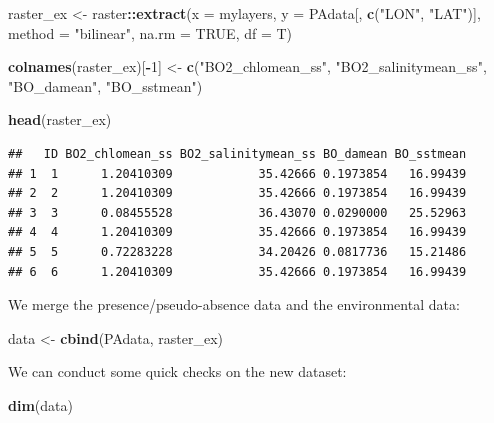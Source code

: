 \documentclass[
]{book}
\newenvironment{Shaded}{\begin{snugshade}}{\end{snugshade}}
\newcommand{\AttributeTok}[1]{\textcolor[rgb]{0.13,0.29,0.53}{#1}}
\newcommand{\ConstantTok}[1]{\textcolor[rgb]{0.56,0.35,0.01}{#1}}
\newcommand{\DecValTok}[1]{\textcolor[rgb]{0.00,0.00,0.81}{#1}}
\newcommand{\FunctionTok}[1]{\textcolor[rgb]{0.13,0.29,0.53}{\textbf{#1}}}
\newcommand{\NormalTok}[1]{#1}
\newcommand{\OtherTok}[1]{\textcolor[rgb]{0.56,0.35,0.01}{#1}}
\newcommand{\SpecialCharTok}[1]{\textcolor[rgb]{0.81,0.36,0.00}{\textbf{#1}}}
\newcommand{\StringTok}[1]{\textcolor[rgb]{0.31,0.60,0.02}{#1}}
\begin{document}
\begin{Shaded}
\begin{Highlighting}[]
\NormalTok{raster\_ex }\OtherTok{\textless{}{-}}\NormalTok{ raster}\SpecialCharTok{::}\FunctionTok{extract}\NormalTok{(}\AttributeTok{x =}\NormalTok{ mylayers,}
    \AttributeTok{y =}\NormalTok{ PAdata[, }\FunctionTok{c}\NormalTok{(}\StringTok{"LON"}\NormalTok{, }\StringTok{"LAT"}\NormalTok{)], }\AttributeTok{method =} \StringTok{"bilinear"}\NormalTok{,}
    \AttributeTok{na.rm =} \ConstantTok{TRUE}\NormalTok{, }\AttributeTok{df =}\NormalTok{ T)}

\FunctionTok{colnames}\NormalTok{(raster\_ex)[}\SpecialCharTok{{-}}\DecValTok{1}\NormalTok{] }\OtherTok{\textless{}{-}} \FunctionTok{c}\NormalTok{(}\StringTok{"BO2\_chlomean\_ss"}\NormalTok{,}
    \StringTok{"BO2\_salinitymean\_ss"}\NormalTok{, }\StringTok{"BO\_damean"}\NormalTok{, }\StringTok{"BO\_sstmean"}\NormalTok{)}

\FunctionTok{head}\NormalTok{(raster\_ex)}
\end{Highlighting}
\end{Shaded}

\begin{verbatim}
##   ID BO2_chlomean_ss BO2_salinitymean_ss BO_damean BO_sstmean
## 1  1      1.20410309            35.42666 0.1973854   16.99439
## 2  2      1.20410309            35.42666 0.1973854   16.99439
## 3  3      0.08455528            36.43070 0.0290000   25.52963
## 4  4      1.20410309            35.42666 0.1973854   16.99439
## 5  5      0.72283228            34.20426 0.0817736   15.21486
## 6  6      1.20410309            35.42666 0.1973854   16.99439
\end{verbatim}

We merge the presence/pseudo-absence data and the environmental data:

\begin{Shaded}
\begin{Highlighting}[]
\NormalTok{data }\OtherTok{\textless{}{-}} \FunctionTok{cbind}\NormalTok{(PAdata, raster\_ex)}
\end{Highlighting}
\end{Shaded}

We can conduct some quick checks on the new dataset:

\begin{Shaded}
\begin{Highlighting}[]
\FunctionTok{dim}\NormalTok{(data)}
\end{Highlighting}
\end{Shaded}
\end{document}
